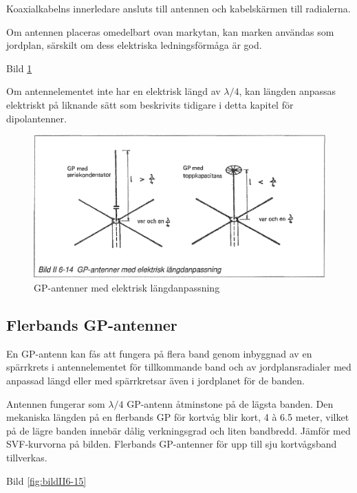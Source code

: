 Koaxialkabelns innerledare ansluts till antennen och kabelskärmen till
radialerna.

Om antennen placeras omedelbart ovan markytan, kan marken användas som
jordplan, särskilt om dess elektriska ledningsförmåga är god.

Bild \ref{fig:bildII6-14}

Om antennelementet inte har en elektrisk längd av \(\lambda/4\), kan
längden anpassas elektriskt på liknande sätt som beskrivits tidigare i
detta kapitel för dipolantenner.

\begin{figure}
  \includegraphics[width=\textwidth]{images/bild_2_6-14}
  \caption{GP-antenner med elektrisk längdanpassning}
  \label{fig:bildII6-14}
\end{figure}

\subsection{Flerbands GP-antenner}

En GP-antenn kan fås att fungera på flera band genom inbyggnad av en
spärrkrets i antennelementet för tillkommande band och av
jordplansradialer med anpassad längd eller med spärrkretsar även i
jordplanet för de banden.

Antennen fungerar som \(\lambda/4\) GP-antenn åtminstone på de lägsta
banden. Den mekaniska längden på en flerbands GP för kortvåg blir
kort, 4 à 6.5 meter, vilket på de lägre banden innebär dålig
verkningsgrad och liten bandbredd. Jämför med SVF-kurvorna på
bilden. Flerbands GP-antenner för upp till sju kortvågsband
tillverkas.

Bild \ref{fig:bildII6-15}


